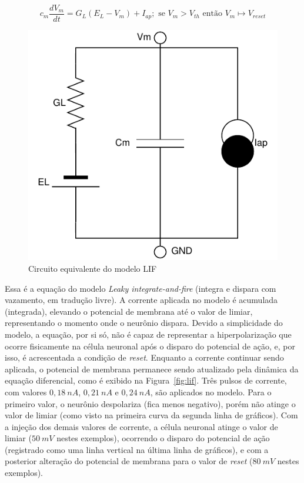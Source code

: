 \begin{equation}\label{eq:lif}
	c_m\frac{dV_m}{dt} = G_L(E_L-V_m)+I_{ap}; \text{ se } V_m > V_{th} \text{ então } V_m\mapsto V_{reset}
\end{equation}
\begin{figure}[htb!]
	\centering
	\caption{Circuito equivalente do modelo LIF}
	\label{fig:circuitolif}
	\includegraphics[width=0.5\linewidth]{figs/circuito_lif}
\end{figure}
Essa é a equação do modelo \textit{Leaky integrate-and-fire} (integra e dispara com vazamento, em tradução livre). A corrente aplicada no modelo é acumulada (integrada), elevando o potencial de membrana até o valor de limiar, representando o momento onde o neurônio dispara. Devido a simplicidade do modelo, a equação, por si só, não é capaz de representar a hiperpolarização que ocorre fisicamente na célula neuronal após o disparo do potencial de ação, e, por isso, é acrescentada a condição de \textit{reset}. Enquanto a corrente continuar sendo aplicada, o potencial de membrana permanece sendo atualizado pela dinâmica da equação diferencial, como é exibido na Figura~\ref{fig:lif}. Três pulsos de corrente, com valores $0,18\ nA$, $0,21\ nA$ e $0,24\ nA$, são aplicados no modelo. Para o primeiro valor, o neurônio despolariza (fica menos negativo), porém não atinge o valor de limiar (como visto na primeira curva da segunda linha de gráficos). Com a injeção dos demais valores de corrente, a célula neuronal atinge o valor de limiar ($50\ mV$ nestes exemplos), ocorrendo o disparo do potencial de ação (registrado como uma linha vertical na última linha de gráficos), e com a posterior alteração do potencial de membrana para o valor de \textit{reset} ($80\ mV$ nestes exemplos).

